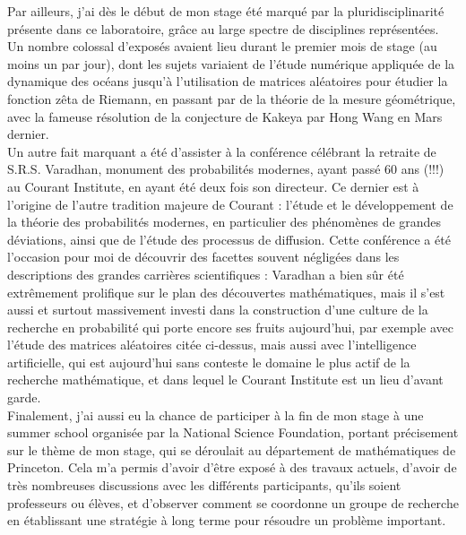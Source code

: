 \documentclass[11pt,a4paper]{article}
\begin{document}
\hspace*{2em} Par ailleurs, j'ai dès le début de mon stage été marqué par la pluridisciplinarité présente dans ce laboratoire, grâce au large spectre de disciplines représentées. Un nombre colossal d'exposés avaient lieu durant le premier mois de stage (au moins un par jour), dont les sujets variaient de l'étude numérique appliquée de la dynamique des océans jusqu'à l'utilisation de matrices aléatoires pour étudier la fonction zêta de Riemann, en passant par de la théorie de la mesure géométrique, avec la fameuse résolution de la conjecture de Kakeya par Hong Wang en Mars dernier. \\
\hspace*{2em} Un autre fait marquant a été d'assister à la conférence célébrant la retraite de S.R.S. Varadhan, monument des probabilités modernes, ayant passé 60 ans (!!!) au Courant Institute, en ayant été deux fois son directeur. Ce dernier est à l'origine de l'autre tradition majeure de Courant : l'étude et le développement de la théorie des probabilités modernes, en particulier des phénomènes de grandes déviations, ainsi que de l'étude des processus de diffusion. Cette conférence a été l'occasion pour moi de découvrir des facettes souvent négligées dans les descriptions des grandes carrières scientifiques : Varadhan a bien sûr été extrêmement prolifique sur le plan des découvertes mathématiques, mais il s'est aussi et surtout massivement investi dans la construction d'une culture de la recherche en probabilité qui porte encore ses fruits aujourd'hui, par exemple avec l'étude des matrices aléatoires citée ci-dessus, mais aussi avec l'intelligence artificielle, qui est aujourd'hui sans conteste le domaine le plus actif de la recherche mathématique, et dans lequel le Courant Institute est un lieu d'avant garde. \\
\hspace*{2em} Finalement, j'ai aussi eu la chance de participer  à la fin de mon stage à une summer school organisée par la National Science Foundation, portant précisement sur le thème de mon stage, qui se déroulait au département de mathématiques de Princeton. Cela m'a permis d'avoir d'être exposé à des travaux actuels, d'avoir de très nombreuses discussions avec les différents participants, qu'ils soient professeurs ou élèves, et d'observer comment se coordonne un groupe de recherche en établissant une stratégie à long terme pour résoudre un problème important. \\
\end{document}
